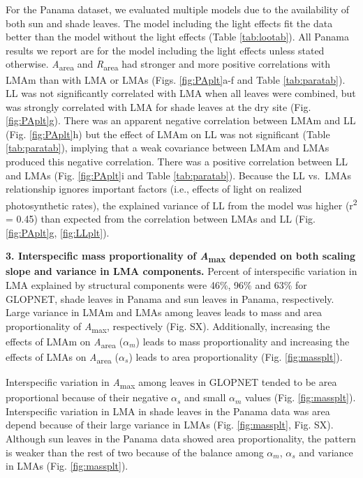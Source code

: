 \documentclass[
  12pt,
]{article}
\begin{document}
For the Panama dataset, we evaluated multiple models due to the availability of both sun and shade leaves.
The model including the light effects fit the data better than the model without the light effects (Table \ref{tab:lootab}).
All Panama results we report are for the model including the light effects unless stated otherwise.
\emph{A}\textsubscript{area} and \emph{R}\textsubscript{area} had stronger and more positive correlations with LMAm than with LMA or LMAs (Figs. \ref{fig:PAplt}a-f and Table \ref{tab:paratab}).
LL was not significantly correlated with LMA when all leaves were combined, but was strongly correlated with LMA for shade leaves at the dry site (Fig. \ref{fig:PAplt}g).
There was an apparent negative correlation between LMAm and LL (Fig. \ref{fig:PAplt}h) but the effect of LMAm on LL was not significant (Table \ref{tab:paratab}), implying that a weak covariance between LMAm and LMAs produced this negative correlation.
There was a positive correlation between LL and LMAs (Fig. \ref{fig:PAplt}i and Table \ref{tab:paratab}).
Because the LL vs.~LMAs relationship ignores important factors (i.e., effects of light on realized photosynthetic rates), the explained variance of LL from the model was higher (r\textsuperscript{2} = 0.45) than expected from the correlation between LMAs and LL (Fig. \ref{fig:PAplt}g, \ref{fig:LLplt}).

\textbf{3. Interspecific mass proportionality of \emph{A}\textsubscript{max} depended on both scaling slope and variance in LMA components.}
Percent of interspecific variation in LMA explained by structural components were 46\%, 96\% and 63\% for GLOPNET, shade leaves in Panama and sun leaves in Panama, respectively.
Large variance in LMAm and LMAs among leaves leads to mass and area proportionality of \emph{A}\textsubscript{max}, respectively (Fig. SX). Additionally, increasing the effects of LMAm on \emph{A}\textsubscript{area} (\(\alpha_m\)) leads to mass proportionality and increasing the effects of LMAs on \emph{A}\textsubscript{area} (\(\alpha_s\)) leads to area proportionality (Fig. \ref{fig:massplt}).

Interspecific variation in \emph{A}\textsubscript{max} among leaves in GLOPNET tended to be area proportional because of their negative \(\alpha_s\) and small \(\alpha_m\) values (Fig. \ref{fig:massplt}).
Interspecific variation in LMA in shade leaves in the Panama data was area depend because of their large variance in LMAs (Fig. \ref{fig:massplt}, Fig. SX).
Although sun leaves in the Panama data showed area proportionality, the
pattern is weaker than the rest of two because of the balance among \(\alpha_m\), \(\alpha_s\) and variance in LMAs (Fig. \ref{fig:massplt}).
\end{document}
